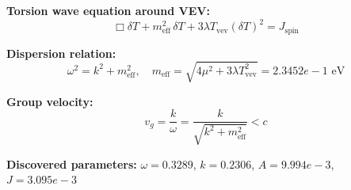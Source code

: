 
\textbf{Torsion wave equation around VEV:}
\begin{equation}
  \Box \delta T + m_{\text{eff}}^2 \, \delta T + 3\lambda T_{\text{vev}} (\delta T)^2 = J_{\text{spin}}
\end{equation}

\textbf{Dispersion relation:}
\begin{equation}
  \omega^2 = k^2 + m_{\text{eff}}^2, \quad
  m_{\text{eff}} = \sqrt{4\mu^2 + 3\lambda T_{\text{vev}}^2} = 2.3452e-1 \text{ eV}
\end{equation}

\textbf{Group velocity:}
\begin{equation}
  v_g = \frac{k}{\omega} = \frac{k}{\sqrt{k^2 + m_{\text{eff}}^2}} < c
\end{equation}

\textbf{Discovered parameters:}
$\omega = 0.3289$, \quad
$k = 0.2306$, \quad
$A = 9.994e-3$, \quad
$J = 3.095e-3$